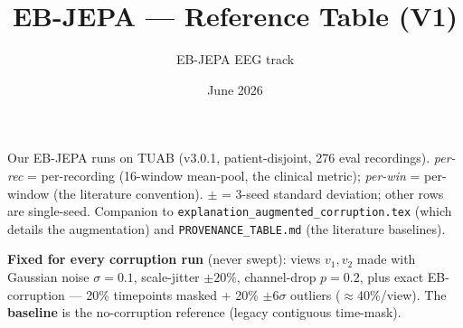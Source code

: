 \documentclass[10pt,a4paper]{article}
\title{\textbf{EB-JEPA --- Reference Table (V1)}}
\author{EB-JEPA EEG track}
\date{June 2026}
\begin{document}
\maketitle

\noindent Our EB-JEPA runs on TUAB (v3.0.1, patient-disjoint, 276 eval recordings).
\emph{per-rec} = per-recording (16-window mean-pool, the clinical metric); \emph{per-win} =
per-window (the literature convention). $\pm$ = 3-seed standard deviation; other rows are
single-seed. Companion to \texttt{explanation\_augmented\_corruption.tex} (which details the
augmentation) and \texttt{PROVENANCE\_TABLE.md} (the literature baselines).

\bigskip


\bigskip

\noindent\textbf{Fixed for every corruption run} (never swept): views $v_1,v_2$ made with Gaussian
noise $\sigma=0.1$, scale-jitter $\pm20\%$, channel-drop $p=0.2$, plus exact EB-corruption ---
20\% timepoints masked + 20\% $\pm6\sigma$ outliers ($\approx$40\%/view). The \textbf{baseline} is
the no-corruption reference (legacy contiguous time-mask).
\end{document}
